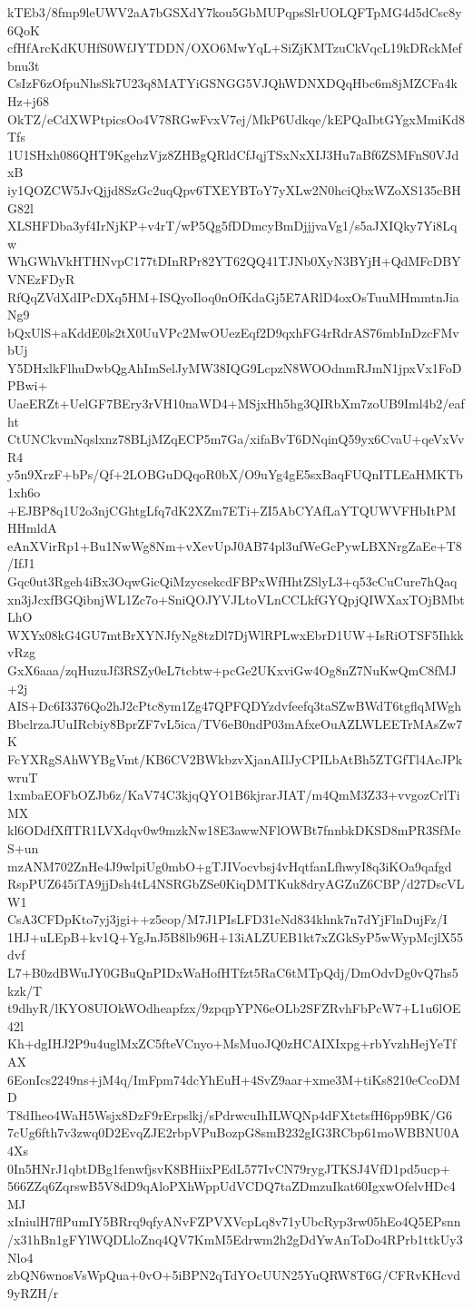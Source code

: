 kTEb3/8fmp9leUWV2aA7bGSXdY7kou5GbMUPqpsSlrUOLQFTpMG4d5dCsc8y6QoK
cfHfArcKdKUHfS0WfJYTDDN/OXO6MwYqL+SiZjKMTzuCkVqcL19kDRckMefbnu3t
CsIzF6zOfpuNhsSk7U23q8MATYiGSNGG5VJQhWDNXDQqHbc6m8jMZCFa4kHz+j68
OkTZ/eCdXWPtpicsOo4V78RGwFvxV7ej/MkP6Udkqe/kEPQaIbtGYgxMmiKd8Tfs
1U1SHxh086QHT9KgehzVjz8ZHBgQRldCfJqjTSxNxXIJ3Hu7aBf6ZSMFnS0VJdxB
iy1QOZCW5JvQjjd8SzGc2uqQpv6TXEYBToY7yXLw2N0hciQbxWZoXS135cBHG82l
XLSHFDba3yf4IrNjKP+v4rT/wP5Qg5fDDmcyBmDjjjvaVg1/s5aJXIQky7Yi8Lqw
WhGWhVkHTHNvpC177tDInRPr82YT62QQ41TJNb0XyN3BYjH+QdMFcDBYVNEzFDyR
RfQqZVdXdIPcDXq5HM+ISQyoIloq0nOfKdaGj5E7ARlD4oxOsTuuMHmmtnJiaNg9
bQxUlS+aKddE0ls2tX0UuVPc2MwOUezEqf2D9qxhFG4rRdrAS76mbInDzcFMvbUj
Y5DHxlkFlhuDwbQgAhImSelJyMW38IQG9LcpzN8WOOdnmRJmN1jpxVx1FoDPBwi+
UaeERZt+UelGF7BEry3rVH10naWD4+MSjxHh5hg3QIRbXm7zoUB9Iml4b2/eafht
CtUNCkvmNqslxnz78BLjMZqECP5m7Ga/xifaBvT6DNqinQ59yx6CvaU+qeVxVvR4
y5n9XrzF+bPs/Qf+2LOBGuDQqoR0bX/O9uYg4gE5sxBaqFUQnITLEaHMKTb1xh6o
+EJBP8q1U2o3njCGhtgLfq7dK2XZm7ETi+ZI5AbCYAfLaYTQUWVFHbItPMHHmldA
eAnXVirRp1+Bu1NwWg8Nm+vXevUpJ0AB74pl3ufWeGcPywLBXNrgZaEe+T8/IfJ1
Gqc0ut3Rgeh4iBx3OqwGicQiMzycsekcdFBPxWfHhtZSlyL3+q53cCuCure7hQaq
xn3jJcxfBGQibnjWL1Zc7o+SniQOJYVJLtoVLnCCLkfGYQpjQIWXaxTOjBMbtLhO
WXYx08kG4GU7mtBrXYNJfyNg8tzDl7DjWlRPLwxEbrD1UW+IsRiOTSF5IhkkvRzg
GxX6aaa/zqHuzuJf3RSZy0eL7tcbtw+pcGe2UKxviGw4Og8nZ7NuKwQmC8fMJ+2j
AIS+Dc6I3376Qo2hJ2cPtc8ym1Zg47QPFQDYzdvfeefq3taSZwBWdT6tgflqMWgh
BbclrzaJUuIRcbiy8BprZF7vL5ica/TV6eB0ndP03mAfxeOuAZLWLEETrMAsZw7K
FcYXRgSAhWYBgVmt/KB6CV2BWkbzvXjanAIlJyCPILbAtBh5ZTGfTl4AcJPkwruT
1xmbaEOFbOZJb6z/KaV74C3kjqQYO1B6kjrarJIAT/m4QmM3Z33+vvgozCrlTiMX
kl6ODdfXfITR1LVXdqv0w9mzkNw18E3awwNFlOWBt7fnnbkDKSD8mPR3SfMeS+un
mzANM702ZnHe4J9wlpiUg0mbO+gTJIVocvbsj4vHqtfanLfhwyI8q3iKOa9qafgd
RspPUZ645iTA9jjDsh4tL4NSRGbZSe0KiqDMTKuk8dryAGZuZ6CBP/d27DscVLW1
CsA3CFDpKto7yj3jgi++z5eop/M7J1PIsLFD31eNd834khnk7n7dYjFlnDujFz/I
1HJ+uLEpB+kv1Q+YgJnJ5B8lb96H+13iALZUEB1kt7xZGkSyP5wWypMcjlX55dvf
L7+B0zdBWuJY0GBuQnPIDxWaHofHTfzt5RaC6tMTpQdj/DmOdvDg0vQ7hs5kzk/T
t9dhyR/lKYO8UIOkWOdheapfzx/9zpqpYPN6eOLb2SFZRvhFbPcW7+L1u6lOE42l
Kh+dgIHJ2P9u4uglMxZC5fteVCnyo+MsMuoJQ0zHCAIXIxpg+rbYvzhHejYeTfAX
6EonIcs2249ns+jM4q/ImFpm74dcYhEuH+4SvZ9aar+xme3M+tiKs8210eCcoDMD
T8dIheo4WaH5Wsjx8DzF9rErpslkj/sPdrwcuIhILWQNp4dFXtctsfH6pp9BK/G6
7cUg6fth7v3zwq0D2EvqZJE2rbpVPuBozpG8smB232gIG3RCbp61moWBBNU0A4Xs
0In5HNrJ1qbtDBg1fenwfjsvK8BHiixPEdL577IvCN79rygJTKSJ4VfD1pd5ucp+
566ZZq6ZqrswB5V8dD9qAloPXhWppUdVCDQ7taZDmzuIkat60IgxwOfelvHDc4MJ
xIniulH7flPumIY5BRrq9qfyANvFZPVXVcpLq8v71yUbcRyp3rw05hEo4Q5EPsnn
/x31hBn1gFYlWQDLloZnq4QV7KmM5Edrwm2h2gDdYwAnToDo4RPrb1ttkUy3Nlo4
zbQN6wnosVsWpQua+0vO+5iBPN2qTdYOcUUN25YuQRW8T6G/CFRvKHcvd9yRZH/r
